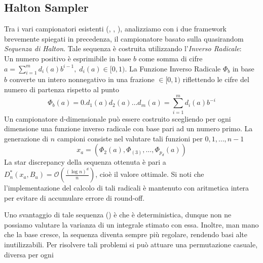 \subsection{Halton Sampler}
Tra i vari campionatori esistenti (\cite{pharr}, \cite{pegoraro}, \cite{akenine-moller}), analizziamo con i due framework brevemente spiegati in 
precedenza, il campionatore basato sulla quasirandom \textit{Sequenza di Halton}. Tale sequenza \`e costruita utilizzando 
l'\textit{Inverso Radicale}:\\
Un numero positivo \`e esprimibile in base $b$ come somma di cifre $a=\sum_{i=1}^{m}d_i(a)b^{i-1},\;d_i(a)\in[0,1)$. La Funzione Inverso Radicale 
$\Phi_b$ in base $b$ converte un intero nonnegativo in una frazione $\in[0,1)$ riflettendo le cifre del numero di partenza rispetto al punto
\begin{equation}
	\Phi_b(a)=0.d_1(a)d_2(a)\ldots d_m(a)=\sum_{i=1}^md_i(a)b^{-i}
\end{equation}
Un campionatore d-dimensionale pu\`o essere costruito scegliendo per ogni dimensione una funzione inverso radicale con base pari ad un numero primo. 
La generazione di $n$ campioni consiste nel valutare tali funzioni per $0,1,\ldots,n-1$
\begin{equation}
	x_a=(\Phi_2(a),\Phi_(3),\ldots,\Phi_{p_d}(a))
\end{equation}
La star discrepancy della sequenza ottenuta \`e pari a \mbox{$D_n^*(x_a,B_u)=\mathcal{O}\left(\frac{(\log n)^d}{n}\right)$}, cio\`e il valore ottimale.
Si noti che l'implementazione del calcolo di tali radicali \`e mantenuto con aritmetica intera per evitare di accumulare errore di round-off.\par
Uno svantaggio di tale sequenza (\cite{pharr}) \`e che \`e deterministica, dunque non ne possiamo valutare la varianza di un integrale stimato con 
essa. Inoltre, man mano che la base cresce, la sequenza diventa sempre pi\`u regolare, rendendo basi alte inutilizzabili. Per risolvere tali problemi
si pu\`o attuare una permutazione casuale, diversa per ogni 
